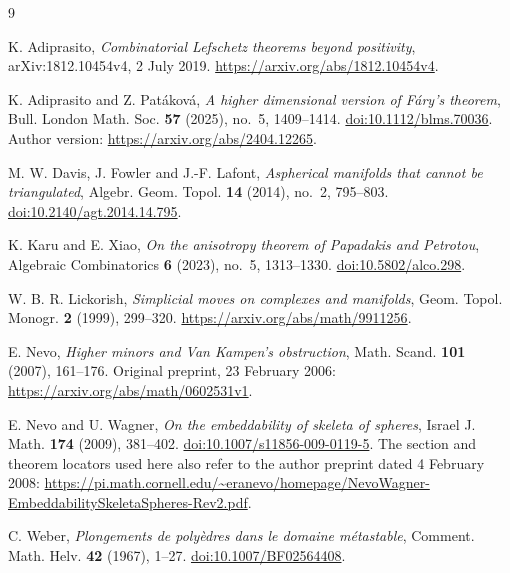 \documentclass[11pt]{article}
\theoremstyle{remark}
\begin{document}
\clearpage
\begin{thebibliography}{9}

K. Adiprasito,
\emph{Combinatorial Lefschetz theorems beyond positivity},
arXiv:1812.10454v4, 2 July 2019.
\url{https://arxiv.org/abs/1812.10454v4}.

K. Adiprasito and Z. Pat\'akov\'a,
\emph{A higher dimensional version of F\'ary's theorem},
Bull. London Math. Soc. \textbf{57} (2025), no.~5, 1409--1414.
\href{https://doi.org/10.1112/blms.70036}{doi:10.1112/blms.70036}.
Author version: \url{https://arxiv.org/abs/2404.12265}.

M. W. Davis, J. Fowler and J.-F. Lafont,
\emph{Aspherical manifolds that cannot be triangulated},
Algebr. Geom. Topol. \textbf{14} (2014), no.~2, 795--803.
\href{https://doi.org/10.2140/agt.2014.14.795}{doi:10.2140/agt.2014.14.795}.

K. Karu and E. Xiao,
\emph{On the anisotropy theorem of Papadakis and Petrotou},
Algebraic Combinatorics \textbf{6} (2023), no.~5, 1313--1330.
\href{https://doi.org/10.5802/alco.298}{doi:10.5802/alco.298}.

W. B. R. Lickorish,
\emph{Simplicial moves on complexes and manifolds},
Geom. Topol. Monogr. \textbf{2} (1999), 299--320.
\url{https://arxiv.org/abs/math/9911256}.

E. Nevo,
\emph{Higher minors and Van Kampen's obstruction},
Math. Scand. \textbf{101} (2007), 161--176.
Original preprint, 23 February 2006:
\url{https://arxiv.org/abs/math/0602531v1}.

E. Nevo and U. Wagner,
\emph{On the embeddability of skeleta of spheres},
Israel J. Math. \textbf{174} (2009), 381--402.
\href{https://doi.org/10.1007/s11856-009-0119-5}{doi:10.1007/s11856-009-0119-5}.
The section and theorem locators used here also refer to the author
preprint dated 4 February 2008:
\url{https://pi.math.cornell.edu/~eranevo/homepage/NevoWagner-EmbeddabilitySkeletaSpheres-Rev2.pdf}.

C. Weber,
\emph{Plongements de poly\`edres dans le domaine m\'etastable},
Comment. Math. Helv. \textbf{42} (1967), 1--27.
\href{https://doi.org/10.1007/BF02564408}{doi:10.1007/BF02564408}.

\end{thebibliography}
\end{document}
